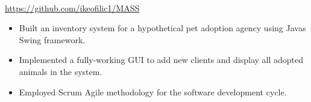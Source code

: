 \\
{\url{https://github.com/ikeofilic1/MASS}}
\begin{itemize}
    \item Built an inventory system for a hypothetical pet adoption agency using Java\textquotesingle s Swing framework.
    \item Implemented a fully-working GUI to add new clients and display all adopted animals in the system.
    \item Employed Scrum Agile methodology for the software development cycle.
\end{itemize}